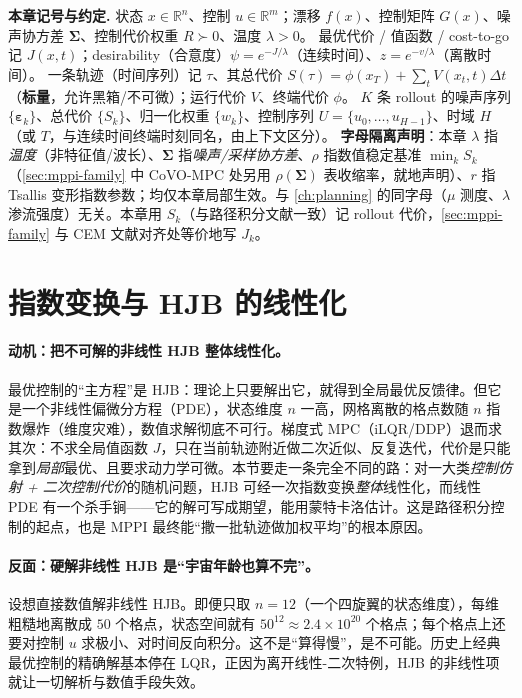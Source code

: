 \begin{note}
\textbf{本章记号与约定.}\;
状态 $x\in\mathbb{R}^n$、控制 $u\in\mathbb{R}^m$；漂移 $f(x)$、控制矩阵 $G(x)$、噪声协方差 $\boldsymbol{\Sigma}$、控制代价权重 $R\succ0$、温度 $\lambda>0$。
最优代价 / 值函数 / cost-to-go 记 $J(x,t)$；desirability（合意度）$\psi=e^{-J/\lambda}$（连续时间）、$z=e^{-v/\lambda}$（离散时间）。
一条轨迹（时间序列）记 $\tau$、其总代价 $S(\tau)=\phi(x_T)+\sum_t V(x_t,t)\Delta t$（\textbf{标量}，允许黑箱/不可微）；运行代价 $V$、终端代价 $\phi$。
$K$ 条 rollout 的噪声序列 $\{\boldsymbol{\varepsilon}_k\}$、总代价 $\{S_k\}$、归一化权重 $\{w_k\}$、控制序列 $U=\{u_0,\dots,u_{H-1}\}$、时域 $H$（或 $T$，与连续时间终端时刻同名，由上下文区分）。
\textbf{字母隔离声明}：本章 $\lambda$ 指\emph{温度}（非特征值/波长）、$\boldsymbol{\Sigma}$ 指\emph{噪声/采样协方差}、$\rho$ 指数值稳定基准 $\min_k S_k$（\cref{sec:mppi-family} 中 CoVO-MPC 处另用 $\rho(\boldsymbol{\Sigma})$ 表收缩率，就地声明）、$r$ 指 Tsallis 变形指数参数；均仅本章局部生效。与 \cref{ch:planning} 的同字母（$\mu$ 测度、$\lambda$ 渗流强度）无关。本章用 $S_k$（与路径积分文献一致）记 rollout 代价，\cref{sec:mppi-family} 与 CEM 文献对齐处等价地写 $J_k$。
\end{note}

\section{指数变换与 HJB 的线性化}
\label{sec:mppi-hjb}

\paragraph{动机：把不可解的非线性 HJB 整体线性化。}
最优控制的“主方程”是 HJB：理论上只要解出它，就得到全局最优反馈律。但它是一个非线性偏微分方程（PDE），状态维度 $n$ 一高，网格离散的格点数随 $n$ 指数爆炸（维度灾难），数值求解彻底不可行\cite{kappen2005linear}。梯度式 MPC（iLQR/DDP）退而求其次：不求全局值函数 $J$，只在当前轨迹附近做二次近似、反复迭代，代价是只能拿到\emph{局部}最优、且要求动力学可微。本节要走一条完全不同的路：对一大类\emph{控制仿射 + 二次控制代价}的随机问题，HJB 可经一次指数变换\emph{整体}线性化，而线性 PDE 有一个杀手锏——它的解可写成期望，能用蒙特卡洛估计。这是路径积分控制的起点，也是 MPPI 最终能“撒一批轨迹做加权平均”的根本原因。

\paragraph{反面：硬解非线性 HJB 是“宇宙年龄也算不完”。}
设想直接数值解非线性 HJB。即便只取 $n=12$（一个四旋翼的状态维度），每维粗糙地离散成 $50$ 个格点，状态空间就有 $50^{12}\approx2.4\times10^{20}$ 个格点；每个格点上还要对控制 $u$ 求极小、对时间反向积分。这不是“算得慢”，是不可能。历史上经典最优控制的精确解基本停在 LQR，正因为离开线性-二次特例，HJB 的非线性项就让一切解析与数值手段失效。

